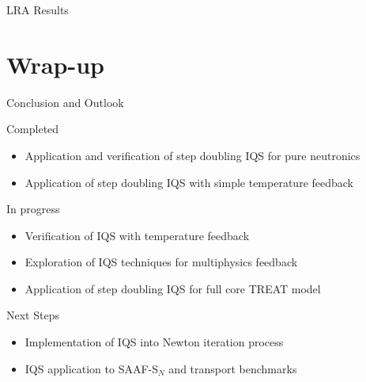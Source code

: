 \documentclass[8pt]{beamer}
\newcommand{\bi}{\begin{itemize}}
\newcommand{\ei}{\end{itemize}}
\begin{document}
\begin{frame}{LRA Results}
\begin{table}
\begin{center}
\end{center}
\end{table}

\end{frame}


\section{Wrap-up}

\begin{frame}{Conclusion and Outlook}

\begin{block}{Completed}
\bi
\item Application and verification of step doubling IQS for pure neutronics
\item Application of step doubling IQS with simple temperature feedback
\ei
\end{block}

\begin{block}{In progress}
\bi 
\item Verification of IQS with temperature feedback
\item Exploration of IQS techniques for multiphysics feedback
\item Application of step doubling IQS for full core TREAT model
\ei
\end{block}

\begin{block}{Next Steps}
\bi 
\item Implementation of IQS into Newton iteration process
\item IQS application to SAAF-S$_N$ and transport benchmarks
\ei
\end{block}

\end{frame}
\end{document}
